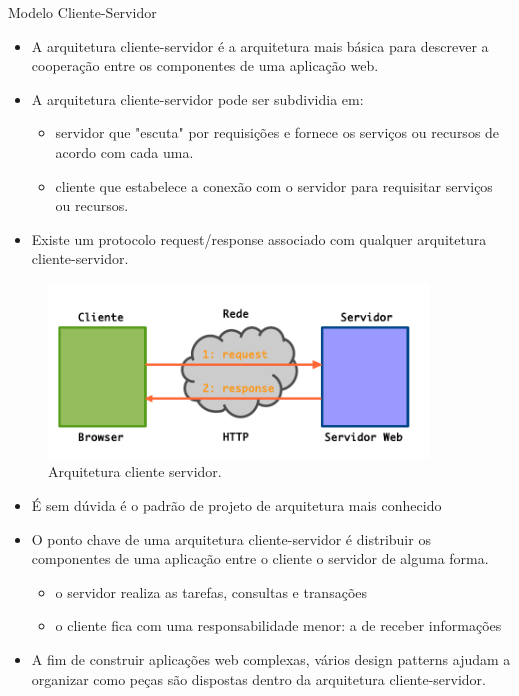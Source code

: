 \begin{frame}{Modelo Cliente-Servidor}
	\begin{itemize}
		\item A arquitetura \alert{cliente-servidor} é a arquitetura mais básica para descrever a cooperação
		entre os componentes de uma aplicação web.
		\item A arquitetura cliente-servidor pode ser subdividia em:
		\begin{itemize}
			\item \alert{servidor} que "escuta" por requisições e fornece os serviços ou recursos de acordo com 
			cada  uma.
			\item \alert{cliente} que estabelece a conexão com o servidor para requisitar serviços ou recursos.
		\end{itemize}
		\item Existe um protocolo \alert{request/response} associado com qualquer arquitetura cliente-servidor.
	\end{itemize}
	\begin{figure}[h!]
		\centering
		\includegraphics[width=0.90\textwidth]{imagens/cliente-servidor-1.png}
		\caption{Arquitetura cliente servidor.}
	\end{figure} 
	
\framebreak
  \begin{itemize}
    \item É sem dúvida é o padrão de projeto de arquitetura mais conhecido
    \item O ponto chave de uma arquitetura cliente-servidor é \alert{distribuir} os componentes de uma 
      aplicação entre o cliente o servidor de alguma forma. 
    \begin{itemize}
        \item o servidor realiza as tarefas, consultas e transações
        \item o cliente fica com uma responsabilidade menor: a de receber informações
    \end{itemize} 
    \item A fim de construir aplicações web complexas, vários design patterns ajudam a \alert{organizar} como peças 
      são dispostas dentro da arquitetura cliente-servidor.
  \end{itemize}
\end{frame}
